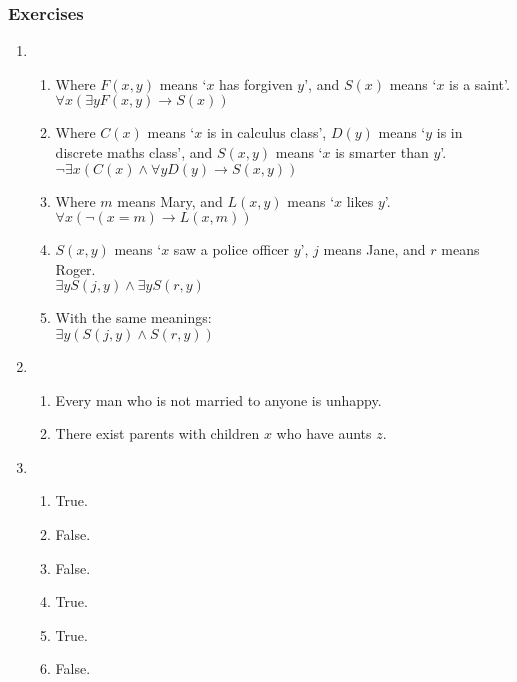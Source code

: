 \documentclass[a4paper, 11pt]{article}
\newcommand\setItemnumber[1]{\setcounter{enumi}{\numexpr#1-1\relax}}
\begin{document}
\clearpage

\subsubsection{Exercises}

\begin{enumerate}
  \item
        \begin{enumerate}
          \item Where $F(x, y)$ means `$x$ has forgiven $y$', and $S(x)$ means `$x$ is a saint'. \\ $\forall x (\exists y F(x,y) \rightarrow S(x))$
          \item Where $C(x)$ means `$x$ is in calculus class', $D(y)$ means `$y$ is in discrete maths class', and $S(x,y)$ means `$x$ is smarter than $y$'. \\ $\neg \exists x (C(x) \wedge \forall y D(y) \rightarrow  S(x,y))$
          \item Where $m$ means Mary, and $L(x, y)$ means `$x$ likes $y$'. \\ $\forall x (\neg (x = m) \rightarrow L(x, m))$
          \item $S(x, y)$ means `$x$ saw a police officer $y$', $j$ means Jane, and $r$ means Roger. \\ $\exists y S(j, y) \wedge \exists y S(r, y)$
          \item With the same meanings: \\ $\exists y (S(j, y) \wedge S(r, y))$
        \end{enumerate}
        \setItemnumber{4}
  \item
        \begin{enumerate}
          \item Every man who is not married to anyone is unhappy.
          \item There exist parents with children $x$ who have aunts $z$.
        \end{enumerate}
        \setItemnumber{8}
  \item
        \begin{enumerate}
          \item True.
          \item False.
          \item False.
          \item True.
          \item True.
          \item False.
        \end{enumerate}
\end{enumerate}
\end{document}
